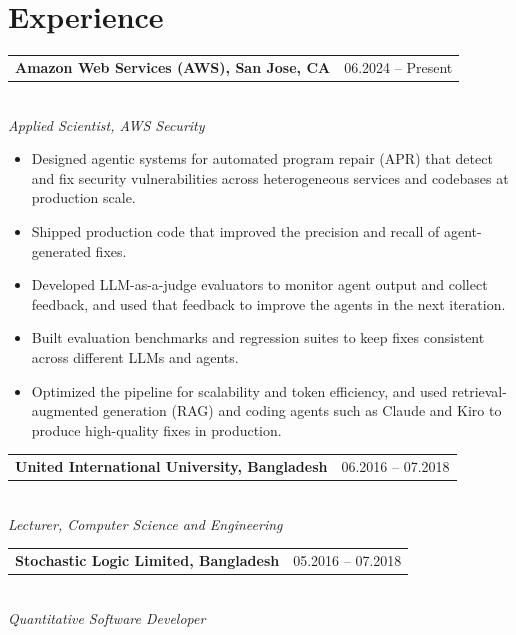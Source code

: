 \documentclass[11pt,letterpaper]{article}
\makeatletter
\newcommand{\cvhead}[2]{%
  \begin{tabular*}{\linewidth}{@{}l@{\extracolsep{\fill}}r@{}}%
    \textbf{#1} & {\small\color{muted}#2}%
  \end{tabular*}\\[2pt]}
\makeatother
\begin{document}
\section{Experience}
\cvhead{Amazon Web Services (AWS), San Jose, CA}{06.2024 -- Present}%
\textit{Applied Scientist, AWS Security}
\begin{itemize}
  \item Designed agentic systems for automated program repair (APR) that detect and fix
        security vulnerabilities across heterogeneous services and codebases at production scale.
  \item Shipped production code that improved the precision and recall of agent-generated fixes.
  \item Developed LLM-as-a-judge evaluators to monitor agent output and collect feedback, and
        used that feedback to improve the agents in the next iteration.
  \item Built evaluation benchmarks and regression suites to keep fixes consistent across
        different LLMs and agents.
  \item Optimized the pipeline for scalability and token efficiency, and used
        retrieval-augmented generation (RAG) and coding agents such as Claude and Kiro to
        produce high-quality fixes in production.
\end{itemize}

\cvhead{United International University, Bangladesh}{06.2016 -- 07.2018}%
\textit{Lecturer, Computer Science and Engineering}

\cvhead{Stochastic Logic Limited, Bangladesh}{05.2016 -- 07.2018}%
\textit{Quantitative Software Developer}

\end{document}
